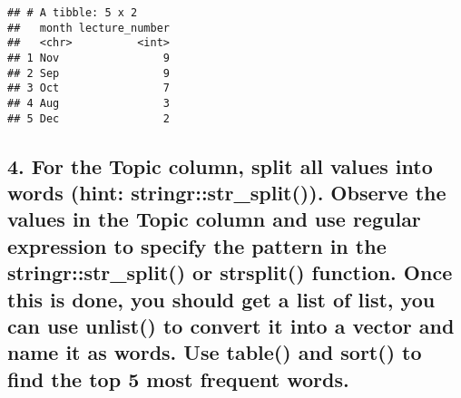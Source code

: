 \documentclass[
]{article}
\newenvironment{Shaded}{\begin{snugshade}}{\end{snugshade}}
\newcommand{\AttributeTok}[1]{\textcolor[rgb]{0.77,0.63,0.00}{#1}}
\newcommand{\FunctionTok}[1]{\textcolor[rgb]{0.00,0.00,0.00}{#1}}
\newcommand{\NormalTok}[1]{#1}
\newcommand{\OtherTok}[1]{\textcolor[rgb]{0.56,0.35,0.01}{#1}}
\newcommand{\SpecialCharTok}[1]{\textcolor[rgb]{0.00,0.00,0.00}{#1}}
\newcommand{\StringTok}[1]{\textcolor[rgb]{0.31,0.60,0.02}{#1}}
\begin{document}
\begin{verbatim}
## # A tibble: 5 x 2
##   month lecture_number
##   <chr>          <int>
## 1 Nov                9
## 2 Sep                9
## 3 Oct                7
## 4 Aug                3
## 5 Dec                2
\end{verbatim}

\hypertarget{for-the-topic-column-split-all-values-into-words-hint-stringrstr_split.-observe-the-values-in-the-topic-column-and-use-regular-expression-to-specify-the-pattern-in-the-stringrstr_split-or-strsplit-function.-once-this-is-done-you-should-get-a-list-of-list-you-can-use-unlist-to-convert-it-into-a-vector-and-name-it-as-words.-use-table-and-sort-to-find-the-top-5-most-frequent-words.}{%
\subsection{4. For the Topic column, split all values into words (hint:
stringr::str\_split()). Observe the values in the Topic column and use
regular expression to specify the pattern in the stringr::str\_split()
or strsplit() function. Once this is done, you should get a list of
list, you can use unlist() to convert it into a vector and name it as
words. Use table() and sort() to find the top 5 most frequent
words.}\label{for-the-topic-column-split-all-values-into-words-hint-stringrstr_split.-observe-the-values-in-the-topic-column-and-use-regular-expression-to-specify-the-pattern-in-the-stringrstr_split-or-strsplit-function.-once-this-is-done-you-should-get-a-list-of-list-you-can-use-unlist-to-convert-it-into-a-vector-and-name-it-as-words.-use-table-and-sort-to-find-the-top-5-most-frequent-words.}}

\begin{Shaded}
\end{Shaded}
\end{document}
